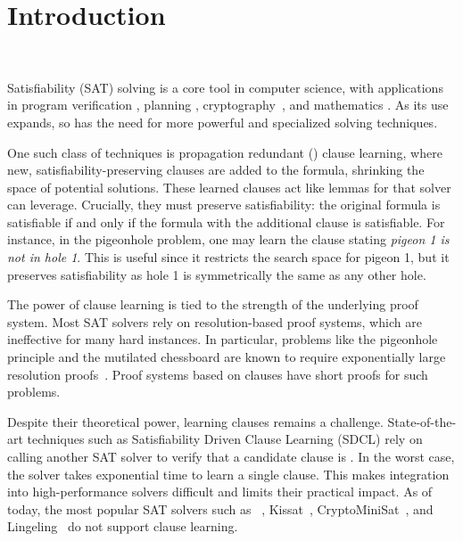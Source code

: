 \section{Introduction}~\label{sec:intro}


Satisfiability (SAT) solving is a core tool in computer science, with applications in program verification \cite{BillionQueries,sat-hardwareverification,ic3,bmc}, planning \cite{planning,planningassat}, cryptography~\cite{cryptominisat}, and mathematics \cite{chromaticnumber,pythagoreantriples,kellersconjecture,emptyhexagon}. As its use expands, so has the need for more powerful and specialized solving techniques.

One such class of techniques is propagation redundant (\pr) clause learning, where new, satisfiability-preserving clauses are added to the formula, shrinking the space of potential solutions. These learned clauses act like lemmas for that solver can leverage. Crucially, they must preserve satisfiability: the original formula is satisfiable if and only if the formula with the additional clause is satisfiable. For instance, in the pigeonhole problem, one may learn the clause stating \emph{pigeon 1 is not in hole 1}. This is useful since it restricts the search space for pigeon 1, but it preserves satisfiability as hole 1 is symmetrically the same as any other hole.



The power of clause learning is tied to the strength of the underlying proof system. Most SAT solvers rely on resolution-based proof systems, which are ineffective for many hard instances. In particular, problems like the pigeonhole principle and the mutilated chessboard are known to require exponentially large resolution proofs~\cite{hakenpigeonhole,mutilatedchessboard-exponential}. Proof systems based on \pr clauses have short proofs for such problems.

Despite their theoretical power, learning \pr clauses remains a challenge. State-of-the-art techniques such as Satisfiability Driven Clause Learning (SDCL) rely on calling another SAT solver to verify that a candidate clause is \pr \cite{sadical}. 
In the worst case, the solver takes exponential time to learn a single \pr clause. This makes integration into high-performance solvers difficult and limits their practical impact. As of today, the most popular SAT solvers such as \cadical~\cite{cadical}, Kissat~\cite{kissat}, CryptoMiniSat~\cite{cryptominisat}, and Lingeling~\cite{lingeling} do not support \pr clause learning.

